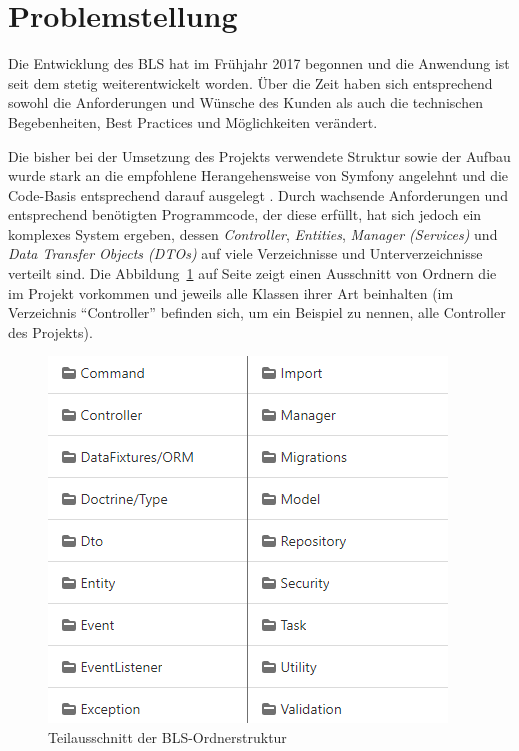 \documentclass[a4paper,12pt,twoside]{scrreprt}
\begin{document}
\section{Problemstellung}
\label{sec:problemstellung}
Die Entwicklung des BLS hat im Frühjahr 2017 begonnen und die Anwendung ist seit dem stetig weiterentwickelt worden. Über die Zeit haben sich entsprechend sowohl die Anforderungen und Wünsche des Kunden als auch die technischen Begebenheiten, Best Practices und Möglichkeiten verändert.

Die bisher bei der Umsetzung des Projekts verwendete Struktur sowie der Aufbau wurde stark an die empfohlene Herangehensweise von Symfony angelehnt und die Code-Basis entsprechend darauf ausgelegt \parencite[siehe dazu][\enquote{The Symfony Framework Best Practices}]{symfony_symfony_nodate}. Durch wachsende Anforderungen und entsprechend benötigten Programmcode, der diese erfüllt, hat sich jedoch ein komplexes System ergeben, dessen \textit{Controller}, \textit{Entities}, \textit{Manager (Services)} und \textit{Data Transfer Objects (DTOs)} auf viele Verzeichnisse und Unterverzeichnisse verteilt sind. Die Abbildung~\ref{fig:ordnerstruktur} auf Seite \pageref{fig:ordnerstruktur} zeigt einen Ausschnitt von Ordnern die im Projekt vorkommen und jeweils alle Klassen ihrer Art beinhalten (im Verzeichnis \enquote{Controller} befinden sich, um ein Beispiel zu nennen, alle Controller des Projekts).

\begin{figure}[ht]
    \centering
    \includegraphics[scale=0.75]{images/bls_folder_structure.png}
    \caption{Teilausschnitt der BLS-Ordnerstruktur}
    \label{fig:ordnerstruktur}
\end{figure}
\end{document}
